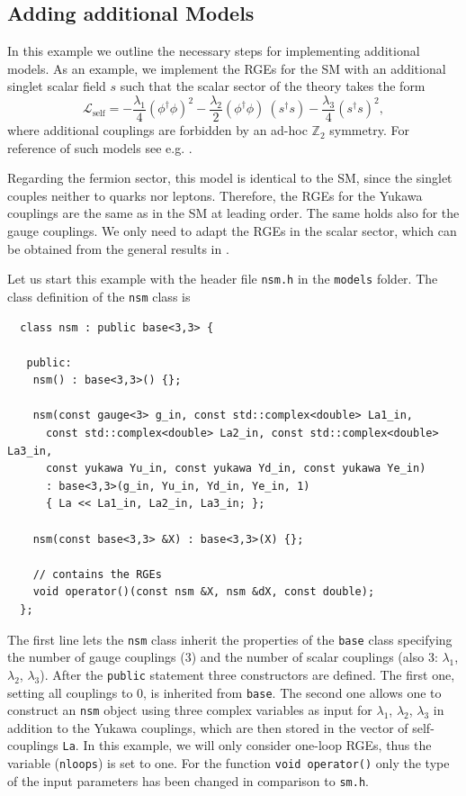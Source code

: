 \documentclass[11pt,a4paper]{article}
\begin{document}
\subsection{\label{sec::adding} Adding additional Models}
In this example we outline the necessary steps for implementing additional models. As an example, we implement the RGEs for the SM with an additional singlet scalar field $s$ such that the scalar sector of the theory takes the form
\begin{equation} \label{eq:nsm_la}
  \mathcal{L}_{\mathrm{self}} = -\frac{\lambda_1}{4} (\phi^\dagger\phi)^2  -\frac{\lambda_2}{2} (\phi^\dagger\phi)\ (s^\dagger s)   -\frac{\lambda_3}{4} (s^\dagger s)^2 ,
\end{equation}
where additional couplings are forbidden by an ad-hoc $\mathbb{Z}_2$ symmetry. For reference of such models see e.g. \cite{Schabinger:2005ei,Patt:2006fw,Bowen:2007ia}.

Regarding the fermion sector, this model is identical to the SM, since the singlet couples neither to quarks nor leptons. Therefore, the RGEs for the Yukawa couplings are the same as in the SM at leading order.
The same holds also for the gauge couplings. We only need to adapt the RGEs in the scalar sector, which can be obtained from the general results in \cite{Machacek:1984zw,Poole:2019kcm}.

Let us start this example with the header file \texttt{nsm.h} in the \texttt{models} folder. The class definition of the \texttt{nsm} class is
\begin{lstlisting}
  class nsm : public base<3,3> {
  
   public:
    nsm() : base<3,3>() {};

    nsm(const gauge<3> g_in, const std::complex<double> La1_in,
      const std::complex<double> La2_in, const std::complex<double> La3_in,
      const yukawa Yu_in, const yukawa Yd_in, const yukawa Ye_in)
      : base<3,3>(g_in, Yu_in, Yd_in, Ye_in, 1)
      { La << La1_in, La2_in, La3_in; };

    nsm(const base<3,3> &X) : base<3,3>(X) {};
 
    // contains the RGEs
    void operator()(const nsm &X, nsm &dX, const double);
  };
\end{lstlisting}
The first line lets the \texttt{nsm} class inherit the properties of the \texttt{base} class specifying the number of gauge couplings (3) and the number of scalar couplings (also 3: $\lambda_1$, $\lambda_2$, $\lambda_3$).
After the \texttt{public} statement three constructors are defined. The first one, setting all couplings to 0, is inherited from \texttt{base}.
The second one allows one to construct an \texttt{nsm} object using three complex variables as input for $\lambda_1$, $\lambda_2$, $\lambda_3$ in addition to the Yukawa couplings,
which are then stored in the vector of self-couplings \texttt{La}.
In this example, we will only consider one-loop RGEs, thus the variable (\texttt{nloops}) is set to one.
For the function \texttt{void operator()} only the type of the input parameters has been changed in comparison to \texttt{sm.h}.
\end{document}
